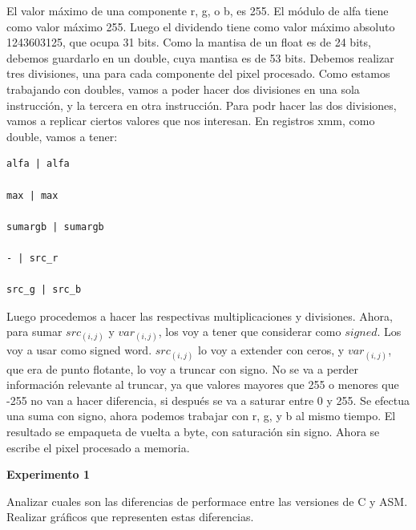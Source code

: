 El valor máximo de una componente r, g, o b, es 255. El módulo de alfa tiene como valor máximo 255. Luego el dividendo tiene como valor máximo
absoluto 1243603125, que ocupa 31 bits. Como la mantisa de un float es de 24 bits, debemos guardarlo en un double, cuya mantisa es de 53 bits.
Debemos realizar tres divisiones, una para cada componente del pixel procesado. Como estamos trabajando con doubles, vamos a poder hacer dos
divisiones en una sola instrucción, y la tercera en otra instrucción. Para podr hacer las dos divisiones, vamos a replicar ciertos valores 
que nos interesan. 
En registros xmm, como double, vamos a tener:

\begin{verbatim}
alfa | alfa

max | max

sumargb | sumargb

- | src_r

src_g | src_b
\end{verbatim}

Luego procedemos a hacer las respectivas multiplicaciones y divisiones. Ahora, para sumar $src_{(i,j)}$ y $var_{(i,j)}$, los voy a tener que
considerar como $signed$. Los voy a usar como signed word.  $src_{(i,j)}$ lo voy a extender con ceros, y $var_{(i,j)}$, que era
de punto flotante, lo voy a truncar con signo. No se va a perder información relevante al truncar, ya que valores mayores que 255 o menores que
-255 no van a hacer diferencia, si después se va a saturar entre 0 y 255. Se efectua una suma con signo, ahora podemos trabajar con r, g, y b
al mismo tiempo.
El resultado se empaqueta de vuelta a byte, con saturación sin signo. Ahora se escribe el pixel procesado a memoria.

\vspace*{0.3cm} \noindent
\textbf{Experimento 1}

  Analizar cuales son las diferencias de performace entre las versiones de C y ASM. 
  Realizar gráficos que representen estas diferencias.

